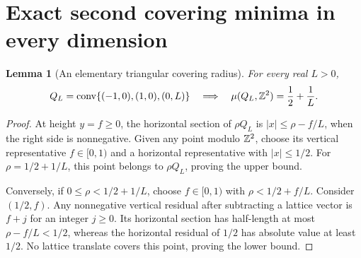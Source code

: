 \documentclass[11pt,a4paper]{article}
\newtheorem{lemma}[theorem]{Lemma}
\theoremstyle{remark}\newtheorem{remark}[theorem]{Remark}
\DeclareMathOperator{\conv}{conv}
\begin{document}
\section{Exact second covering minima in every dimension}
\label{rr:sec:exact}

\begin{lemma}[An elementary triangular covering radius]
\label{rr:lem:QL}
For every real $L>0$,
\[
 Q_L=\conv\{(-1,0),(1,0),(0,L)\}
 \quad\Longrightarrow\quad
 \mu(Q_L,\Z^2)=\frac12+\frac1L.
\]
\end{lemma}
\begin{proof}
At height $y=f\ge0$, the horizontal section of $\rho Q_L$ is
$|x|\le\rho-f/L$, when the right side is nonnegative.
Given any point modulo $\mathbb Z^2$, choose its vertical representative
$f\in[0,1)$ and a horizontal representative with $|x|\le1/2$.
For $\rho=1/2+1/L$, this point belongs to $\rho Q_L$, proving
the upper bound.

Conversely, if $0\le\rho<1/2+1/L$, choose $f\in[0,1)$ with
$\rho<1/2+f/L$.  Consider $(1/2,f)$.  Any nonnegative vertical
residual after subtracting a lattice vector is $f+j$ for an
integer $j\ge0$.  Its horizontal section has half-length at most
$\rho-f/L<1/2$, whereas the horizontal residual of $1/2$ has
absolute value at least $1/2$.  No lattice translate covers this
point, proving the lower bound.
\end{proof}
\end{document}
